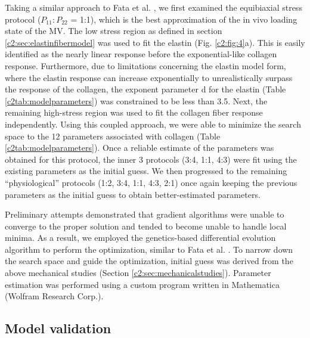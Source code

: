     Taking a similar approach to Fata et al. \cite{fata_insights_2014}, we first examined the equibiaxial stress protocol ($P_{11}:P_{22}$ = 1:1), which is the best approximation of the in vivo loading state of the MV. The low stress region as defined in section \ref{c2:sec:elastinfibermodel} was used to fit the elastin (Fig. \ref{c2:fig:4}a). This is easily identified as the nearly linear response before the exponential-like collagen response. Furthermore, due to limitations concerning the elastin model form, where the elastin response can increase exponentially to unrealistically surpass the response of the collagen, the exponent parameter d for the elastin (Table \ref{c2tab:modelparameters}) was constrained to be less than 3.5. Next, the remaining high-stress region was used to fit the collagen fiber response independently. Using this coupled approach, we were able to minimize the search space to the 12 parameters associated with collagen (Table \ref{c2tab:modelparameters}). Once a reliable estimate of the parameters was obtained for this protocol, the inner 3 protocols (3:4, 1:1, 4:3) were fit using the existing parameters as the initial guess. We then progressed to the remaining “physiological” protocols (1:2, 3:4, 1:1, 4:3, 2:1) once again keeping the previous parameters as the initial guess to obtain better-estimated parameters.
    
    
    Preliminary attempts demonstrated that gradient algorithms were unable to converge to the proper solution and tended to become unable to handle local minima. As a result, we employed the genetics-based differential evolution algorithm to perform the optimization, similar to Fata et al. \cite{fata_insights_2014}. To narrow down the search space and guide the optimization, initial guess was derived from the above mechanical studies (Section \ref{c2:sec:mechanicalstudies}). Parameter estimation was performed using a custom program written in Mathematica (Wolfram Research Corp.).
    




\subsection{Model validation} \label{c2:sec:26}


